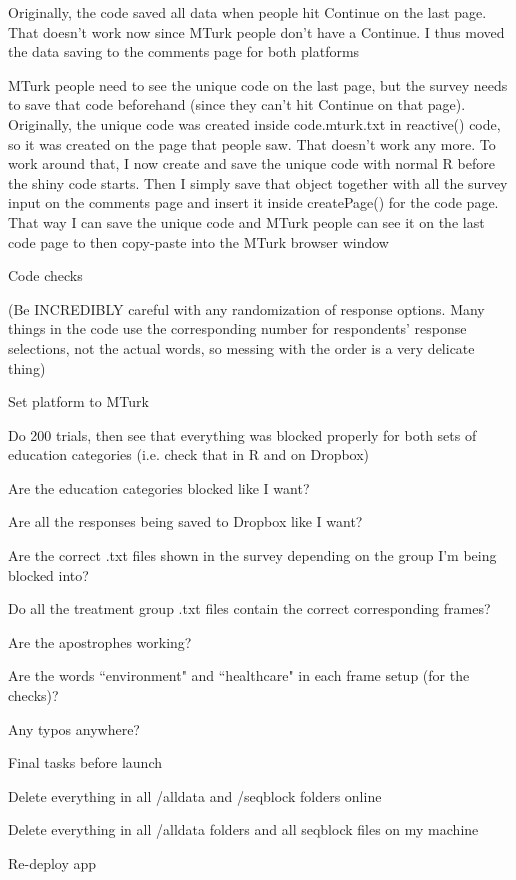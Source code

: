 \documentclass[12pt]{article}
\begin{document}
\begin{coi}
\begin{coi}
				\item Originally, the code saved all data when people hit Continue on the last page. That doesn't work now since MTurk people don't have a Continue. I thus moved the data saving to the comments page for both platforms
				\item MTurk people need to see the unique code on the last page, but the survey needs to save that code beforehand (since they can't hit Continue on that page). Originally, the unique code was created inside code.mturk.txt in reactive() code, so it was created on the page that people saw. That doesn't work any more. To work around that, I now create and save the unique code with normal R before the shiny code starts. Then I simply save that object together with all the survey input on the comments page and insert it inside createPage() for the code page. That way I can save the unique code and MTurk people can see it on the last code page to then copy-paste into the MTurk browser window
			\end{coi}
		\item Code checks
			\begin{coi}
				\item (Be INCREDIBLY careful with any randomization of response options. Many things in the code use the corresponding number for respondents' response selections, not the actual words, so messing with the order is a very delicate thing)
				\item Set platform to MTurk
				\item Do 200 trials, then see that everything was blocked properly for both sets of education categories (i.e. check that in R and on Dropbox)
				\item Are the education categories blocked like I want?
				\item Are all the responses being saved to Dropbox like I want?
				\item Are the correct .txt files shown in the survey depending on the group I'm being blocked into?
				\item Do all the treatment group .txt files contain the correct corresponding frames?
				\item Are the apostrophes working?
				\item Are the words ``environment" and ``healthcare" in each frame setup (for the checks)?
				\item Any typos anywhere?
			\end{coi}
		\item Final tasks before launch
			\begin{coi}
				\item Delete everything in all /alldata and /seqblock folders online 
				\item Delete everything in all /alldata folders and all seqblock files on my machine
				\item Re-deploy app
			\end{coi}			
	\end{coi}
\end{document}
